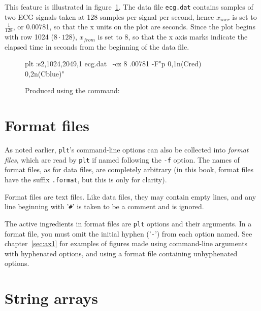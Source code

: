 \documentclass{book}
\begin{document}
This feature is illustrated in figure~\ref{fig:ecg}.  The data file
{\tt ecg.dat} contains samples of two ECG signals taken at 128 samples per
signal per second, hence $x_{incr}$ is set to $\frac{1}{128}$, or 0.00781, so
that the x units on the plot are seconds.  Since the plot begins with
row 1024 ($8 \cdot 128$), $x_{from}$ is set to 8, so that the x axis
marks indicate the elapsed time in seconds from the beginning of the data
file.

\begin{figure}
\begin{center}
\caption[Example with data specification]{Produced using the command:
\label{fig:ecg}}
\begin{center}
\begin{boxedverbatim}
plt :s2,1024,2049,1 ecg.dat \
    -cz 8 .00781 -F"p 0,1n(Cred) 0,2n(Cblue)"
\end{boxedverbatim}
\end{center}
\end{center}
\end{figure}

\section{Format files}

%
As noted earlier, {\tt plt}'s command-line options can also be collected
into {\em format files}, which are read by {\tt plt} if named following
the {\tt -f} option.  The names of format files, as for data files, are
completely arbitrary (in this book, format files have the suffix
{\tt .format}, but this is only for clarity).

Format files are text files.  Like data files, they may contain empty
lines, and any line beginning with '{\tt \#}' is taken to be a comment and
is ignored.

The active ingredients in format files are {\tt plt} options and their
arguments.  In a format file, you must omit the initial hyphen ('{\tt -}')
from each option named.  See chapter~\ref{sec:ax1} for examples of figures
made using command-line arguments with hyphenated options, and using a
format file containing unhyphenated options.

\section{String arrays \label{sec:string-arrays}}
\end{document}
